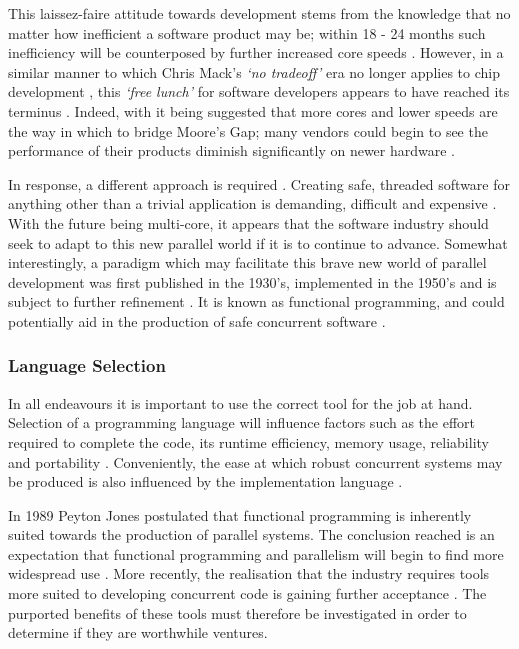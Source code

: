 \documentclass[12pt,a4paper]{article}
\begin{document}
This laissez-faire attitude towards development stems from the knowledge that no matter how inefficient a software product may be; within 18 - 24 months such inefficiency will be counterposed by further increased core speeds \cite{theFreeLunchIsOver}. However, in a similar manner to which Chris Mack's \textit{`no tradeoff'} era no longer applies to chip development \cite{fiftyYearsOfMoores}, this \textit{`free lunch'} for software developers appears to have reached its terminus \cite{theFreeLunchIsOver}. Indeed, with it being suggested that more cores and lower speeds are the way in which to bridge Moore's Gap; many vendors could begin to see the performance of their products diminish significantly on newer hardware \cite{theFreeLunchIsOver,concurrencyChallenges}.

In response, a different approach is required \cite{concurrencyChallenges}. Creating safe, threaded software for anything other than a trivial application is demanding, difficult and expensive \cite{concurrencyChallenges}. With the future being multi-core, it appears that the software industry should seek to adapt to this new parallel world if it is to continue to advance. Somewhat interestingly, a paradigm which may facilitate this brave new world of parallel development was first published in the 1930's, implemented in the 1950's and is subject to further refinement \cite{church1936,lispPart1,joyOfClojure}. It is known as functional programming, and could potentially aid in the production of safe concurrent software \cite{promisesOfFunctionalProgramming}.

\subsubsection{Language Selection}

In all endeavours it is important to use the correct tool for the job at hand. Selection of a programming language will influence factors such as the effort required to complete the code, its runtime efficiency, memory usage, reliability and portability \cite{languageComparison}. Conveniently, the ease at which robust concurrent systems may be produced is also influenced by the implementation language \cite{paraFuncImp,promisesOfFunctionalProgramming}.

In 1989 Peyton Jones \cite{paraFuncImp} postulated that functional programming is inherently suited towards the production of parallel systems. The conclusion reached is an expectation that functional programming and parallelism will begin to find more widespread use \cite{paraFuncImp}. More recently, the realisation that the industry requires tools more suited to developing concurrent code is gaining further acceptance \cite{promisesOfFunctionalProgramming}. The purported benefits of these tools must therefore be investigated in order to determine if they are worthwhile ventures.
\end{document}
